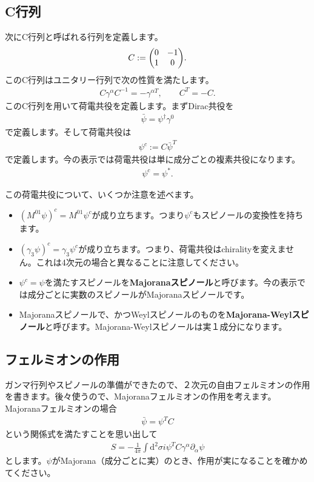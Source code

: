 \documentclass[report,paper=a4, fontsize=12pt, line_length=16cm, number_of_lines=33,dvipdfmx]{jlreq}
\numberwithin{equation}{chapter}
\numberwithin{equation}{section}
\newcommand{\del}{\partial}
\newcommand{\kyou}[1]{{\sffamily \bfseries #1}}
\newcommand{\di}{\mathrm{d}}
\begin{document}
\subsection{C行列}
次にC行列と呼ばれる行列を定義します。
\begin{align}
  C:=\mqty(0 & -1 \\ 1 & 0).
\end{align}
このC行列はユニタリー行列で次の性質を満たします。
\begin{align}
  C\gamma^{\alpha}C^{-1}=-\gamma^{\alpha T},\qquad C^T=-C.
\end{align}
このC行列を用いて荷電共役を定義します。まずDirac共役を
\begin{align}
  \bar{\psi}=\psi^{\dag}\gamma^0
\end{align}
で定義します。そして荷電共役は
\begin{align}
  \psi^{c}:=C\bar{\psi}^{T}
\end{align}
で定義します。今の表示では荷電共役は単に成分ごとの複素共役になります。
\begin{align}
  \psi^{c}=\psi^{*}.
\end{align}

この荷電共役について、いくつか注意を述べます。
\begin{itemize}
  \item $(M^{01}\psi)^c=M^{01}\psi^c$が成り立ちます。つまり$\psi^{c}$もスピノールの変換性を持ちます。
  \item $(\gamma_3 \psi)^{c}=\gamma_3 \psi^c$が成り立ちます。つまり、荷電共役はchiralityを変えません。これは4次元の場合と異なることに注意してください。
  \item $\psi^{c}=\psi$を満たすスピノールを\kyou{Majoranaスピノール}と呼びます。今の表示では成分ごとに実数のスピノールがMajoranaスピノールです。
  \item Majoranaスピノールで、かつWeylスピノールのものを\kyou{Majorana-Weylスピノール}と呼びます。Majorana-Weylスピノールは実１成分になります。
\end{itemize}

\subsection{フェルミオンの作用}
ガンマ行列やスピノールの準備ができたので、２次元の自由フェルミオンの作用を書きます。後々使うので、Majoranaフェルミオンの作用を考えます。Majoranaフェルミオンの場合
\begin{align}
  \bar{\psi}=\psi^{T}C
\end{align}
という関係式を満たすことを思い出して
\begin{align}
  S=-\frac{1}{4\pi}\int \di^2 \sigma i\psi^{T}C\gamma^{\alpha}\del_{\alpha}\psi\label{fermionaction0}
\end{align}
とします。$\psi$がMajorana（成分ごとに実）のとき、作用が実になることを確かめてください。
\end{document}
